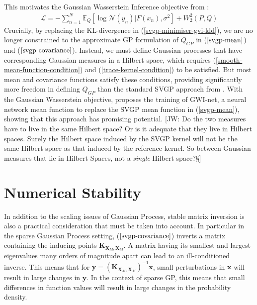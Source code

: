 \documentclass[twoside,11pt]{article}
\newcommand{\jw}[1]{{\color{gray} [JW: #1]}}
\newcommand{\KLD}{\operatorname{KLD}}
\begin{document}
\\This motivates the Gaussian Wasserstein Inference objective from \cite{wild2022generalized}:
\begin{align}
    \label{gwi-objective}
    \mathcal{L} = -\sum_{n=1}^N \mathbb{E}_{Q}\left[\log \mathcal{N}(y_n) \vert F(x_n), \sigma^2\right] + W_2^2 (P, Q)
\end{align}
Crucially, by replacing the KL-divergence in (\ref{svgp-minimiser-gvi-kld}), we are no longer constrained to the approximate GP formulation of $Q_{GP}$ in  ($\ref{svgp-mean}$) and ($\ref{svgp-covariance}$). Instead, we must define Gaussian processes that have corresponding Gaussian measures in a Hilbert space, which requires (\ref{smooth-mean-function-condition}) and (\ref{trace-kernel-condition}) to be satisfied. But most mean and covariance functions satisfy these conditions, providing significantly more freedom in defining $Q_{GP}$ than the standard SVGP approach from \cite{titsias2009variational}. With the Gaussian Wasserstein objective, \cite{wild2022generalized} proposes the training of GWI-net, a neural network mean function to replace the SVGP mean function in (\ref{svgp-mean}), showing that this approach has promising potential.
\jw{Do the two measures have to live in the same Hilbert space? Or is it adequate that they live in Hilbert spaces. Surely the Hilbert space induced by the SVGP kernel will not be the same Hilbert space as that induced by the reference kernel. So between Gaussian measures that lie in Hilbert Spaces, not a \textit{single} Hilbert space?§}

\section{Numerical Stability \cite{burt2020convergence}}
In addition to the scaling issues of Gaussian Process, stable matrix inversion is also a practical consideration that must be taken into account. In particular in the sparse Gaussian Process setting,  ($\ref{svgp-covariance}$)  inverts a matrix containing the inducing points  $\mathbf{K}_{\mathbf{X}_M, \mathbf{X}_M}$. A matrix having its smallest and largest eigenvalues many orders of magnitude apart can lead to an ill-conditioned inverse. This means that for $\mathbf{y} = \left(\mathbf{K}_{\mathbf{X}_M, \mathbf{X}_M}\right)^{-1}\mathbf{x}$, small perturbations in $\mathbf{x}$ will result in large changes in $\mathbf{y}$. In the context of sparse GP, this means that small differences in function values will result in large changes in the probability density. 
\end{document}
